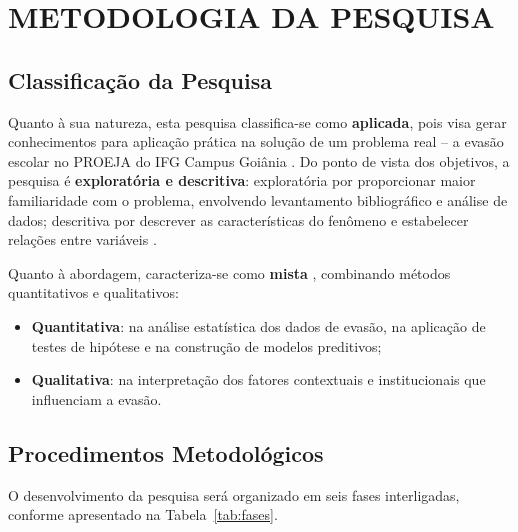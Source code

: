 \documentclass[12pt,a4paper]{article}
\begin{document}
\section{METODOLOGIA DA PESQUISA}

\subsection{Classificação da Pesquisa}

Quanto à sua natureza, esta pesquisa classifica-se como \textbf{aplicada}, pois visa gerar conhecimentos para aplicação prática na solução de um problema real -- a evasão escolar no PROEJA do IFG Campus Goiânia \cite{prodanov2013}. Do ponto de vista dos objetivos, a pesquisa é \textbf{exploratória e descritiva}: exploratória por proporcionar maior familiaridade com o problema, envolvendo levantamento bibliográfico e análise de dados; descritiva por descrever as características do fenômeno e estabelecer relações entre variáveis \cite{gil2008}.

Quanto à abordagem, caracteriza-se como \textbf{mista} \cite{creswell2010}, combinando métodos quantitativos e qualitativos:
\begin{itemize}
    \item \textbf{Quantitativa}: na análise estatística dos dados de evasão, na aplicação de testes de hipótese e na construção de modelos preditivos;
    \item \textbf{Qualitativa}: na interpretação dos fatores contextuais e institucionais que influenciam a evasão.
\end{itemize}

\subsection{Procedimentos Metodológicos}

O desenvolvimento da pesquisa será organizado em seis fases interligadas, conforme apresentado na Tabela~\ref{tab:fases}.
\end{document}
